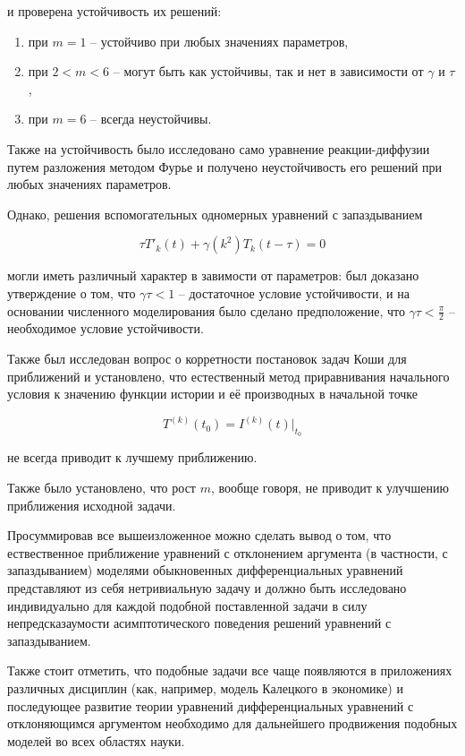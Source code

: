 и проверена устойчивость их решений:

\begin{enumerate}
\item при $m=1$ \--- устойчиво при любых значениях параметров,
\item при $2 < m < 6$ \--- могут быть как устойчивы, так и нет в зависимости от $\gamma$ и $\tau$,
\item при $m=6$ \--- всегда неустойчивы.
\end{enumerate}

Также на устойчивость было исследовано само уравнение реакции-диффузии путем разложения методом Фурье и получено неустойчивость его решений при любых значениях параметров.

Однако, решения вспомогательных одномерных уравнений с запаздыванием

\begin{equation*}
\tau T'_k(t) + \gamma(k^2) T_k(t-\tau) = 0
\end{equation*}

могли иметь различный характер в завимости от параметров: был доказано утверждение о том, что $\gamma \tau < 1$ \--- достаточное условие устойчивости, и на основании численного моделирования было сделано предположение, что $\gamma \tau < \frac{\pi}{2}$ \--- необходимое условие устойчивости.

Также был исследован вопрос о корретности постановок задач Коши для приближений и установлено, что естественный метод приравнивания начального условия к значению функции истории и её производных в начальной точке 

\begin{equation*}
T^{(k)}(t_0) = I^{(k)}(t)|_{t_0}
\end{equation*}

не всегда приводит к лучшему приближению.

Также было установлено, что рост $m$, вообще говоря, не приводит к улучшению приближения исходной задачи.

Просуммировав все вышеизложенное можно сделать вывод о том, что ествественное приближение уравнений с отклонением аргумента (в частности, с запаздыванием) моделями обыкновенных дифференциальных уравнений представляют из себя нетривиальную задачу и должно быть исследовано индивидуально для каждой подобной поставленной задачи в силу непредсказаумости асимптотического поведения решений уравнений с запаздыванием.

Также стоит отметить, что подобные задачи все чаще появляются в приложениях различных дисциплин (как, например, модель Калецкого в экономике) и последующее развитие теории уравнений дифференциальных уравнений с отклоняющимся аргументом необходимо для дальнейшего продвижения подобных моделей во всех областях науки.